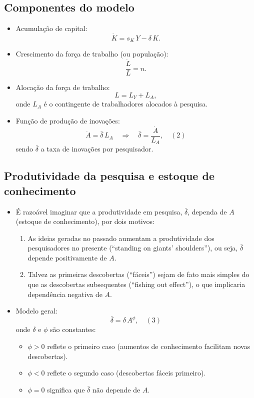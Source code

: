 \documentclass[a4paper,12pt]{article}[abntex2]
\begin{document}
\subsection{\textbf{Componentes do modelo}}
\begin{itemize}
    \item Acumulação de capital:
      \[
        \dot{K} = s_K \,Y - \delta \,K.
      \]
    \item Crescimento da força de trabalho (ou população):
      \[
        \frac{\dot{L}}{L} = n.
      \]
    \item Alocação da força de trabalho:
      \[
        L = L_Y + L_A,
      \]
      onde $L_A$ é o contingente de trabalhadores alocados à pesquisa.
    \item Função de produção de inovações:
      \[
        \dot{A} = \bar{\delta} \,L_A
        \quad \Longrightarrow \quad
        \bar{\delta} = \frac{\dot{A}}{L_A},
        \quad (2)
      \]
      sendo $\bar{\delta}$ a taxa de inovações por pesquisador.
\end{itemize}


\subsection{\textbf{Produtividade da pesquisa e estoque de conhecimento}}
\begin{itemize}
    \item É razoável imaginar que a produtividade em pesquisa, 
          $\bar{\delta}$, dependa de $A$ (estoque de conhecimento), por dois motivos:
          \begin{enumerate}
            \item As ideias geradas no passado aumentam a produtividade dos pesquisadores 
                  no presente (``standing on giants' shoulders''), ou seja, 
                  $\bar{\delta}$ depende positivamente de $A$.
            \item Talvez as primeiras descobertas (``fáceis'') sejam de fato mais simples 
                  do que as descobertas subsequentes (``fishing out effect''), 
                  o que implicaria dependência negativa de $A$.
          \end{enumerate}

    \item Modelo geral:
      \[
        \bar{\delta} = \delta\,A^\phi,
        \quad (3)
      \]
      onde $\delta$ e $\phi$ são constantes:
      \begin{itemize}
        \item $\phi > 0$ reflete o primeiro caso (aumentos de conhecimento facilitam novas descobertas).
        \item $\phi < 0$ reflete o segundo caso (descobertas fáceis primeiro).
        \item $\phi = 0$ significa que $\bar{\delta}$ não depende de $A$.
      \end{itemize}
\end{itemize}
\end{document}
